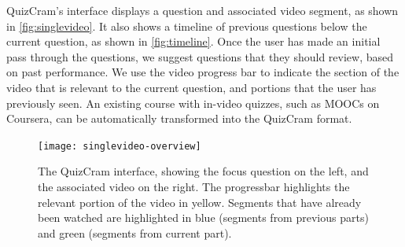 \documentclass{sigchi}
\begin{document}

QuizCram's interface displays a question and associated video segment, as shown in \autoref{fig:singlevideo}. It also shows a timeline of previous questions below the current question, as shown in \autoref{fig:timeline}. Once the user has made an initial pass through the questions, we suggest questions that they should review, based on past performance. We use the video progress bar to indicate the section of the video that is relevant to the current question, and portions that the user has previously seen. An existing course with in-video quizzes, such as MOOCs on Coursera, can be automatically transformed into the QuizCram format. 


\begin{figure}
\centering
\texttt{[image: singlevideo-overview]}
\caption{The QuizCram interface, showing the focus question on the left, and the associated video on the right. The progressbar highlights the relevant portion of the video in yellow. Segments that have already been watched are highlighted in blue (segments from previous parts) and green (segments from current part).}
\label{fig:singlevideo}
\end{figure}
\end{document}

